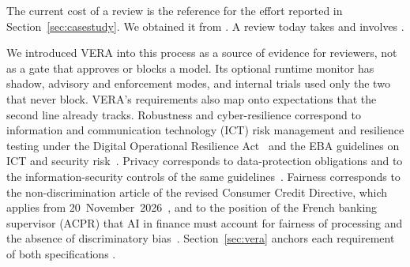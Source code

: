 
The current cost of a review is the reference for the effort reported in Section~\ref{sec:casestudy}.
We obtained it from .
A review today takes  and involves  .

We introduced VERA into this process as a source of evidence for reviewers, not as a gate that approves or blocks a model.
Its optional runtime monitor has shadow, advisory and enforcement modes, and internal trials used only the two that never block.
VERA's requirements also map onto expectations that the second line already tracks.
Robustness and cyber-resilience correspond to information and communication technology (ICT) risk management and resilience testing under the Digital Operational Resilience Act~\cite{dora2022} and the EBA guidelines on ICT and security risk~\cite{eba2021ictrisk}.
Privacy corresponds to data-protection obligations and to the information-security controls of the same guidelines~\cite{eba2021ictrisk}.
Fairness corresponds to the non-discrimination article of the revised Consumer Credit Directive, which applies from 20~November~2026~\cite{euccd2023}, and to the position of the French banking supervisor (ACPR) that AI in finance must account for fairness of processing and the absence of discriminatory bias~\cite{acpr2020ai}.
Section~\ref{sec:vera} anchors each requirement of both specifications .
